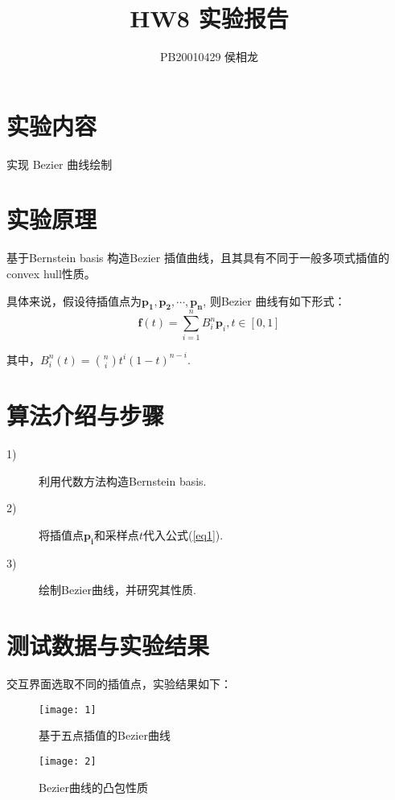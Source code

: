 \documentclass{article}
\title{HW8 实验报告}
\author{PB20010429 侯相龙}
\begin{document}
\maketitle
\section{实验内容}
实现 Bezier 曲线绘制


\section{实验原理}
基于Bernstein basis 构造Bezier 插值曲线，且其具有不同于一般多项式插值的convex hull性质。

具体来说，假设待插值点为$\bm{p_1, p_2, \cdots, p_n}$, 则Bezier 曲线有如下形式：
\begin{equation}\label{eq1}
    \bm{f}(t)=\sum_{i=1}^n B_i^n\bm{p}_i,t\in[0,1]
\end{equation}

其中，$B_i^{n}(t) = \binom{n}{i}t^i(1-t)^{n-i}$.

\section{算法介绍与步骤}
\begin{description}
    \item[1)]利用代数方法构造Bernstein basis.
    \item[2)]将插值点$\bm{p_i}$和采样点$t$代入公式(\ref{eq1}).
    \item[3)]绘制Bezier曲线，并研究其性质.

\end{description}


\section{测试数据与实验结果}
交互界面选取不同的插值点，实验结果如下：

\begin{figure}
    \caption{基于五点插值的Bezier曲线}
    \begin{center}
       \texttt{[image: 1]} 
    \end{center}
\end{figure}

\begin{figure}
    \caption{Bezier曲线的凸包性质}
    \begin{center}
       \texttt{[image: 2]} 
    \end{center}
\end{figure}
\end{document}
